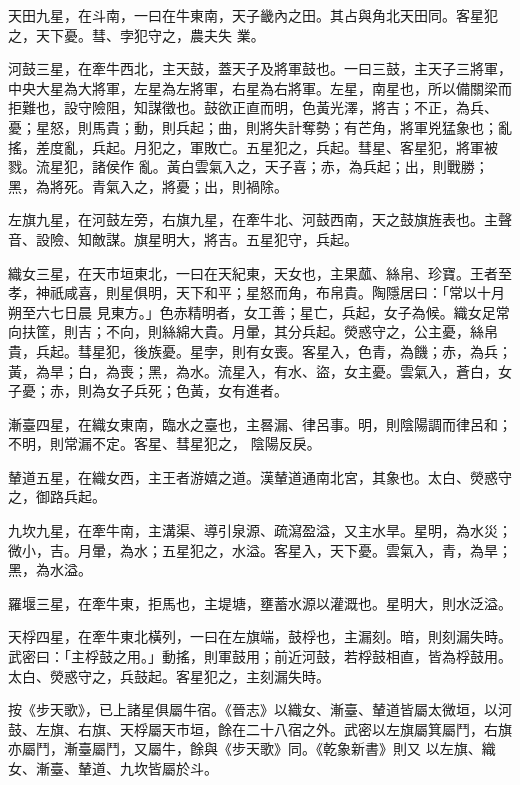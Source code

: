 \begin{pinyinscope}
 天田九星，在斗南，一曰在牛東南，天子畿內之田。其占與角北天田同。客星犯之，天下憂。彗、孛犯守之，農夫失
 業。



 河鼓三星，在牽牛西北，主天鼓，蓋天子及將軍鼓也。一曰三鼓，主天子三將軍，中央大星為大將軍，左星為左將軍，右星為右將軍。左星，南星也，所以備關梁而拒難也，設守險阻，知謀徵也。鼓欲正直而明，色黃光澤，將吉；不正，為兵、憂；星怒，則馬貴；動，則兵起；曲，則將失計奪勢；有芒角，將軍兇猛象也；亂搖，差度亂，兵起。月犯之，軍敗亡。五星犯之，兵起。彗星、客星犯，將軍被戮。流星犯，諸侯作
 亂。黃白雲氣入之，天子喜；赤，為兵起；出，則戰勝；黑，為將死。青氣入之，將憂；出，則禍除。



 左旗九星，在河鼓左旁，右旗九星，在牽牛北、河鼓西南，天之鼓旗旌表也。主聲音、設險、知敵謀。旗星明大，將吉。五星犯守，兵起。



 織女三星，在天市垣東北，一曰在天紀東，天女也，主果蓏、絲帛、珍寶。王者至孝，神祇咸喜，則星俱明，天下和平；星怒而角，布帛貴。陶隱居曰：「常以十月朔至六七日晨
 見東方。」色赤精明者，女工善；星亡，兵起，女子為候。織女足常向扶筐，則吉；不向，則絲綿大貴。月暈，其分兵起。熒惑守之，公主憂，絲帛貴，兵起。彗星犯，後族憂。星孛，則有女喪。客星入，色青，為饑；赤，為兵；黃，為旱；白，為喪；黑，為水。流星入，有水、盜，女主憂。雲氣入，蒼白，女子憂；赤，則為女子兵死；色黃，女有進者。



 漸臺四星，在織女東南，臨水之臺也，主晷漏、律呂事。明，則陰陽調而律呂和；不明，則常漏不定。客星、彗星犯之，
 陰陽反戾。



 輦道五星，在織女西，主王者游嬉之道。漢輦道通南北宮，其象也。太白、熒惑守之，御路兵起。



 九坎九星，在牽牛南，主溝渠、導引泉源、疏瀉盈溢，又主水旱。星明，為水災；微小，吉。月暈，為水；五星犯之，水溢。客星入，天下憂。雲氣入，青，為旱；黑，為水溢。



 羅堰三星，在牽牛東，拒馬也，主堤塘，壅蓄水源以灌溉也。星明大，則水泛溢。



 天桴四星，在牽牛東北橫列，一曰在左旗端，鼓桴也，主漏刻。暗，則刻漏失時。武密曰：「主桴鼓之用。」動搖，則軍鼓用；前近河鼓，若桴鼓相直，皆為桴鼓用。太白、熒惑守之，兵鼓起。客星犯之，主刻漏失時。



 按《步天歌》，已上諸星俱屬牛宿。《晉志》以織女、漸臺、輦道皆屬太微垣，以河鼓、左旗、右旗、天桴屬天市垣，餘在二十八宿之外。武密以左旗屬箕屬鬥，右旗亦屬鬥，漸臺屬鬥，又屬牛，餘與《步天歌》同。《乾象新書》則又
 以左旗、織女、漸臺、輦道、九坎皆屬於斗。




\end{pinyinscope}
